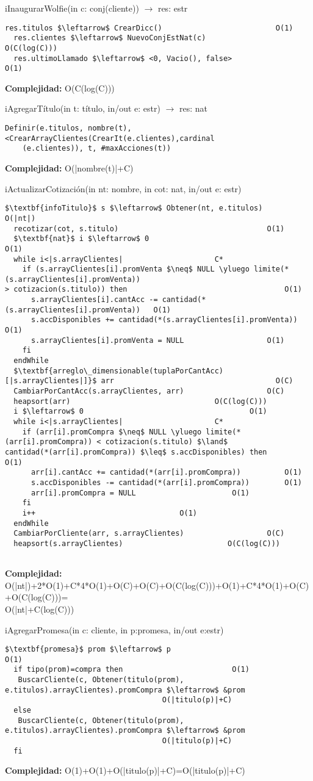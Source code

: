 iInaugurarWolfie(in c: conj(cliente)) $\rightarrow$ res: estr
\begin{lstlisting}[mathescape]
  res.titulos $\leftarrow$ CrearDicc()							O(1)
  res.clientes $\leftarrow$ NuevoConjEstNat(c)					O(C(log(C)))	
  res.ultimoLlamado $\leftarrow$ <0, Vacio(), false>					O(1)
\end{lstlisting}
\textbf{Complejidad:} O(C(log(C)))

iAgregarT\'itulo(in t: t\'itulo, in/out e: estr) $\rightarrow$ res: nat
\begin{lstlisting}[mathescape]
  Definir(e.titulos, nombre(t), <CrearArrayClientes(CrearIt(e.clientes),cardinal
  	(e.clientes)), t, #maxAcciones(t))
\end{lstlisting}
\textbf{Complejidad:} O(|nombre(t)|+C)

iActualizarCotizaci\'on(in nt: nombre, in cot: nat, in/out e: estr)
\begin{lstlisting}[mathescape]
  $\textbf{infoTitulo}$ s $\leftarrow$ Obtener(nt, e.titulos) 		O(|nt|)
  recotizar(cot, s.titulo)									O(1)
  $\textbf{nat}$ i $\leftarrow$ 0										O(1)
  while i<|s.arrayClientes|						C*
    if (s.arrayClientes[i].promVenta $\neq$ NULL \yluego limite(*(s.arrayClientes[i].promVenta))
> cotizacion(s.titulo)) then									O(1)
      s.arrayClientes[i].cantAcc -= cantidad(*(s.arrayClientes[i].promVenta))	O(1)
      s.accDisponibles += cantidad(*(s.arrayClientes[i].promVenta))		O(1)
      s.arrayClientes[i].promVenta = NULL					O(1)
    fi
  endWhile
  $\textbf{arreglo\_dimensionable(tuplaPorCantAcc)[|s.arrayClientes|]}$ arr										O(C)
  CambiarPorCantAcc(s.arrayClientes, arr)					O(C)
  heapsort(arr)								    O(C(log(C)))
  i $\leftarrow$ 0										O(1)
  while i<|s.arrayClientes|						C*
    if (arr[i].promCompra $\neq$ NULL \yluego limite(*(arr[i].promCompra)) < cotizacion(s.titulo) $\land$ 
cantidad(*(arr[i].promCompra)) $\leq$ s.accDisponibles) then			O(1)
      arr[i].cantAcc += cantidad(*(arr[i].promCompra))			O(1)
      s.accDisponibles -= cantidad(*(arr[i].promCompra))		O(1)
      arr[i].promCompra = NULL						O(1)
    fi
    i++									O(1)
  endWhile
  CambiarPorCliente(arr, s.arrayClientes)					O(C)
  heapsort(s.arrayClientes)						   O(C(log(C)))
  
\end{lstlisting}
\textbf{Complejidad:} O(|nt|)+2*O(1)+C*4*O(1)+O(C)+O(C)+O(C(log(C)))+O(1)+C*4*O(1)+O(C)+O(C(log(C)))=\\\indent\indent\indent O(|nt|+C(log(C)))

iAgregarPromesa(in c: cliente, in p:promesa, in/out e:estr)
\begin{lstlisting}[mathescape]
  $\textbf{promesa}$ prom $\leftarrow$ p									O(1)
  if tipo(prom)=compra then							O(1)
   BuscarCliente(c, Obtener(titulo(prom), e.titulos).arrayClientes).promCompra $\leftarrow$ &prom
   									O(|titulo(p)|+C)
  else
   BuscarCliente(c, Obtener(titulo(prom), e.titulos).arrayClientes).promCompra $\leftarrow$ &prom
   									O(|titulo(p)|+C)
  fi
\end{lstlisting}
\textbf{Complejidad:} O(1)+O(1)+O(|titulo(p)|+C)=O(|titulo(p)|+C)

